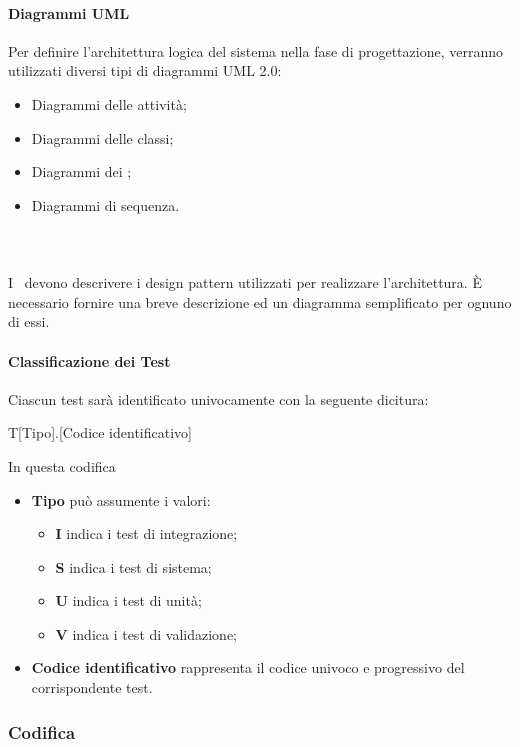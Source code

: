 \documentclass[../NormeDiProgetto.tex]{subfiles}
\begin{document}
			\paragraph{Diagrammi UML\\}
				Per definire l'architettura logica del sistema nella fase di progettazione,
				verranno utilizzati	diversi tipi di diagrammi UML 2.0:
				\begin{itemize}
					\item Diagrammi delle attività;
					\item Diagrammi delle classi;
					\item Diagrammi dei ;
					\item Diagrammi di sequenza.
				\end{itemize}
			\paragraph{\\}
				I \progettisti\ devono descrivere i design pattern utilizzati per realizzare l'architettura.
				È necessario fornire una breve descrizione ed un diagramma semplificato per ognuno di essi.
			\paragraph{Classificazione dei Test}
			Ciascun test sarà identificato univocamente con la seguente dicitura:
			\begin{center}
				T[Tipo].[Codice identificativo]
			\end{center}
			In questa codifica
			\begin{itemize}
				\item \textbf{Tipo} può assumente i valori:
				\begin{itemize}
					\item \textbf{I} indica i test di integrazione;
					\item \textbf{S} indica i test di sistema;
					\item \textbf{U} indica i test di unità;
					\item \textbf{V} indica i test di validazione;
				\end{itemize}
				\item \textbf{Codice identificativo} rappresenta il codice univoco e progressivo del corrispondente test.
			\end{itemize}
		\subsubsection{Codifica}
\end{document}
